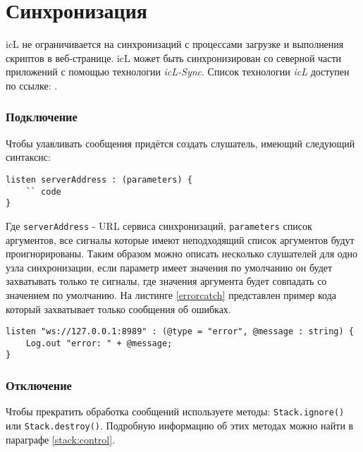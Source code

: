 \section{Синхронизация}
\label{sync}

icL не ограничивается на синхронизаций с процессами загрузке и выполнения скриптов в веб-странице. icL может быть синхронизирован со северной части приложений с помощью технологии \textit{icL-Sync}. Список технологии \textit{icL} доступен по ссылке: .

\subsubsection{Подключение}

Чтобы улавливать сообщения придётся создать слушатель, имеющий следующий синтаксис:
\begin{lstlisting}
listen serverAddress : (parameters) {
	`` code
}
\end{lstlisting}

Где \texttt{serverAddress} - URL сервиса синхронизаций, \texttt{parameters} список аргументов, все сигналы которые имеют неподходящий список аргументов будут проигнорированы. Таким образом можно описать несколько слушателей для одно узла синхронизации, если параметр имеет значения по умолчанию он будет захватывать только те сигналы, где значения аргумента будет совпадать со значением по умолчанию. На листинге \ref{errorcatch} представлен пример кода который захватывает только сообщения об ошибках.


\begin{sourcecode}
\label{errorcatch}
\begin{verbatim}
listen "ws://127.0.0.1:8989" : (@type = "error", @message : string) {
	Log.out "error: " + @message;
}
\end{verbatim}
\end{sourcecode}

\subsubsection{Отключение}

Чтобы прекратить обработка сообщений используете методы: \texttt{Stack.ignore()} или \texttt{Stack.destroy()}. Подробную информацию об этих методах можно найти в параграфе \ref{stack:control}.